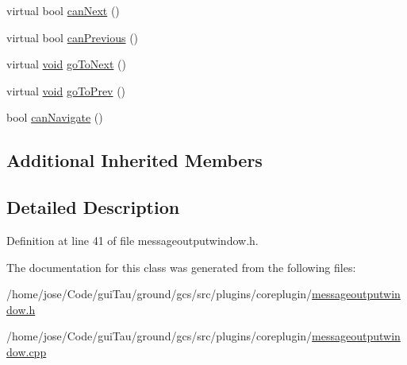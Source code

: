 \begin{DoxyCompactItemize}
virtual bool \hyperlink{group___core_plugin_gacc3882fb4a97e10b34a8ea1397b03d6b}{can\-Next} ()
\item 
virtual bool \hyperlink{group___core_plugin_gaf02af0f848762b44595d1048ead72618}{can\-Previous} ()
\item 
virtual \hyperlink{group___u_a_v_objects_plugin_ga444cf2ff3f0ecbe028adce838d373f5c}{void} \hyperlink{group___core_plugin_ga1d62cc55b88759eb3625e39f33247a9a}{go\-To\-Next} ()
\item 
virtual \hyperlink{group___u_a_v_objects_plugin_ga444cf2ff3f0ecbe028adce838d373f5c}{void} \hyperlink{group___core_plugin_ga69d15cbecd16198a1eb1d7a58f5eb2ff}{go\-To\-Prev} ()
\item 
bool \hyperlink{group___core_plugin_gaff4cb19c93407a117bd72ab89be06eab}{can\-Navigate} ()
\end{DoxyCompactItemize}
\subsection*{Additional Inherited Members}


\subsection{Detailed Description}


Definition at line 41 of file messageoutputwindow.\-h.



The documentation for this class was generated from the following files\-:\begin{DoxyCompactItemize}
\item 
/home/jose/\-Code/gui\-Tau/ground/gcs/src/plugins/coreplugin/\hyperlink{messageoutputwindow_8h}{messageoutputwindow.\-h}\item 
/home/jose/\-Code/gui\-Tau/ground/gcs/src/plugins/coreplugin/\hyperlink{messageoutputwindow_8cpp}{messageoutputwindow.\-cpp}\end{DoxyCompactItemize}
